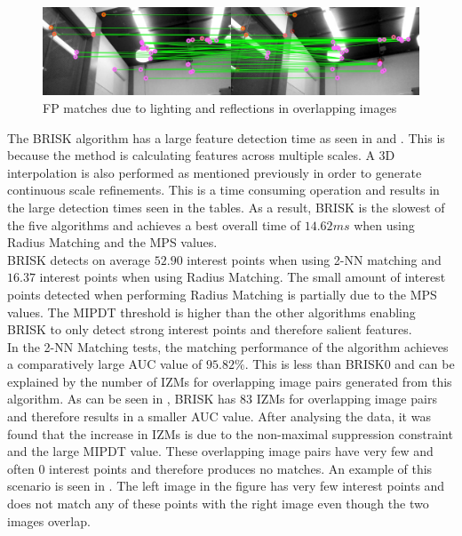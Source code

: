 \documentclass{report}
\begin{document}
\begin{figure}
  \centering
    \includegraphics[width=1.0\textwidth]{../Drawings/Matching/reflectionsBrisk0.jpg}
    \caption{FP matches due to lighting and reflections in overlapping images} 
    \label{fig:reflectionsBrisk0}
\end{figure}


The BRISK algorithm has a large feature detection time as seen in  and . This is because the method is calculating features across multiple scales. A 3D interpolation is also performed as mentioned previously in order to generate continuous scale refinements. This is a time consuming operation and results in the large detection times seen in the tables. As a result, BRISK is the slowest of the five algorithms and achieves a best overall time of $14.62 ms$ when using Radius Matching and the MPS values.\\

BRISK detects on average $52.90$ interest points when using 2-NN matching and $16.37$ interest points when using Radius Matching. The small amount of interest points detected when performing Radius Matching is partially due to the MPS values. The MIPDT threshold is higher than the other algorithms enabling BRISK to only detect strong interest points and therefore salient features.\\

In the 2-NN Matching tests, the matching performance of the algorithm achieves a comparatively large AUC value of $95.82\%$. This is less than BRISK0 and can be explained by the number of IZMs for overlapping image pairs generated from this algorithm. As can be seen in , BRISK has $83$ IZMs for overlapping image pairs and therefore results in a smaller AUC value. After analysing the data, it was found that the increase in IZMs is due to the non-maximal suppression constraint and the large MIPDT value. These overlapping image pairs have very few and often $0$ interest points and therefore produces no matches. An example of this scenario is seen in . The left image in the figure has very few interest points and does not match any of these points with the right image even though the two images overlap.\\
\end{document}
